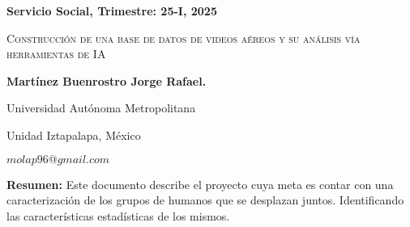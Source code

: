 \documentclass[letterpaper,11pt,twoside]{report}
\date{}
\begin{document}
    \centerline{\bf Servicio Social, Trimestre: 25-I, 2025}
    \centerline{}
    \centerline{}
    \begin{center}
    \Large{\textsc{Construcci\'on de una base de datos de videos a\'ereos y su an\'alisis v\'ia herramientas
de IA
}}
    \end{center}
    \centerline{}
    \centerline{\bf {Martínez Buenrostro Jorge Rafael.}}
    \centerline{}
    \centerline{Universidad Aut\'onoma Metropolitana}
    \centerline{Unidad Iztapalapa, M\'exico}
    \centerline{$molap96@gmail.com$}
    \newtheorem{Theorem}{\quad Theorem}[section]
    \newtheorem{Definition}[Theorem]{\quad Definition}
    \newtheorem{Corollary}[Theorem]{\quad Corollary}
    \newtheorem{Lemma}[Theorem]{\quad Lemma}
    \newtheorem{Example}[Theorem]{\quad Example}
    \bigskip
    \textbf{Resumen:}  Este documento describe el proyecto cuya meta es contar con una caracterización de los grupos de humanos que se desplazan juntos. Identificando las características estadísticas de los mismos.

	

	
    \newpage
	

	
\end{document}

